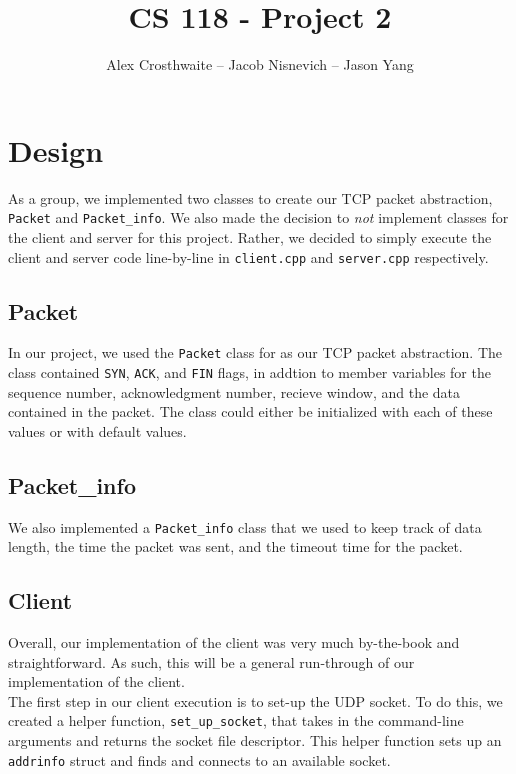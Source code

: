 \documentclass{article}
\begin{document}
\title{CS 118 - Project 2}
\author{Alex Crosthwaite -- Jacob Nisnevich -- Jason Yang}

\maketitle

\section{Design}

As a group, we implemented two classes to create our TCP packet abstraction, \texttt{Packet} and \texttt{Packet\_info}. We also made the decision to \textit{not} implement classes for the client and server for this project. Rather, we decided to simply execute the client and server code line-by-line in \texttt{client.cpp} and \texttt{server.cpp} respectively.

\subsection{Packet}

In our project, we used the \texttt{Packet} class for as our TCP packet abstraction. The class contained \texttt{SYN}, \texttt{ACK}, and \texttt{FIN} flags, in addtion to member variables for the sequence number, acknowledgment number, recieve window, and the data contained in the packet. The class could either be initialized with each of these values or with default values.

\subsection{Packet\_info}

We also implemented a \texttt{Packet\_info} class that we used to keep track of data length, the time the packet was sent, and the timeout time for the packet.

\subsection{Client}

Overall, our implementation of the client was very much by-the-book and straightforward. As such, this will be a general run-through of our implementation of the client. \\

\noindent
The first step in our client execution is to set-up the UDP socket. To do this, we created a helper function, \texttt{set\_up\_socket}, that takes in the command-line arguments and returns the socket file descriptor. This helper function sets up an \texttt{addrinfo} struct and finds and connects to an available socket. \\
\end{document}
